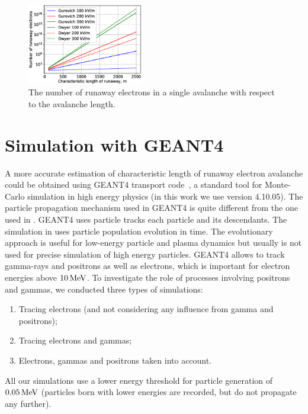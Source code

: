 \documentclass[doublecol,linenumbers]{epl2} %
\begin{document}
\begin{figure}[h]
    \centering
    \includegraphics[width=0.45\textwidth]{figures/gurevich.eps}
    \caption{The number of runaway electrons in a single avalanche with respect to the avalanche length.}
    \label{fig:gur}
\end{figure}

\section{Simulation with GEANT4}
\label{sec:swg}
A more accurate estimation of characteristic length of runaway electron avalanche could be obtained using GEANT4 transport code~\cite{Geant2003,Geant2006, Geant2016}, a standard tool for Monte-Carlo simulation in high energy physics (in this work we use version 4.10.05). The particle propagation mechanism used in GEANT4 is quite different from the one used in \cite{Oreshkin_2018}. GEANT4 uses particle tracks  each particle and its descendants. The simulation in \cite{Oreshkin_2018} uses particle population evolution in time. The evolutionary approach is useful for low-energy particle and plasma dynamics but usually is not used for precise simulation of high energy particles. GEANT4 allows to track gamma-rays and positrons as well as electrons, which is important for electron energies above $10\un{MeV}$. To investigate the role of processes involving positrons and gammas, we conducted three types of simulations: 
\begin{enumerate}
    \item Tracing electrons (and not considering any influence from gamma and positrons);
    \item Tracing electrons and gammas;
    \item Electrons, gammas and positrons  taken into account.
\end{enumerate}

All our simulations use a lower energy threshold for particle generation of $0.05\un{MeV}$ (particles born with lower energies are recorded, but do not propagate any further).
\end{document}
